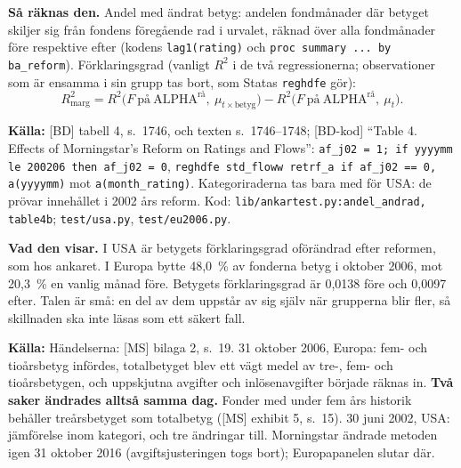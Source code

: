 \documentclass[10pt,a4paper]{article}
\newcommand{\kalla}[1]{\par\noindent\textbf{Källa:} #1\par}
\newcommand{\raknas}{\par\noindent\textbf{Så räknas den.} }
\newcommand{\visar}{\par\noindent\textbf{Vad den visar.} }
\newcommand{\kod}[1]{\texttt{#1}}
\begin{document}
\begin{table}[H]
\caption{Two rating reforms in the form of Table 4 of Ben-David et al.\ (2022). The first row of each panel gives the share of fund-months in which the fund's rating differs from its previous observation in the sample. ``Explained by month $\times$ rating'' is the $R^2$ of a regression of flow on the 18-month raw return with month-by-rating effects, minus the $R^2$ with month effects only; ``category beyond rating'' adds month-by-category effects to month-by-rating effects. The event month counts as before. Panel A: Morningstar began rating U.S. funds within category peer groups on 30 June 2002. Panel B: on 31 October 2006 Morningstar introduced five- and ten-year ratings in Europe and made the overall rating a weighted average of the three-, five- and ten-year ratings (Morningstar 2023, Appendix 2).}
\centering\resizebox{\textwidth}{!}{}
\end{table}
\raknas Andel med ändrat betyg: andelen fondmånader där betyget skiljer sig från fondens föregående rad i urvalet, räknad över alla fondmånader före respektive efter (kodens \kod{lag1(rating)} och \kod{proc summary ... by ba\_reform}). Förklaringsgrad (vanligt $R^2$ i de två regressionerna; observationer som är ensamma i sin grupp tas bort, som Statas \kod{reghdfe} gör):
\begin{equation}
R^2_{\text{marg}}=R^2\big(F\ \text{på}\ \text{ALPHA}^{\text{rå}},\ \mu_{t\times\text{betyg}}\big)-R^2\big(F\ \text{på}\ \text{ALPHA}^{\text{rå}},\ \mu_t\big).
\end{equation}
\kalla{[BD] tabell 4, s.~1746, och texten s.~1746--1748; [BD-kod] ``Table 4. Effects of Morningstar's Reform on Ratings and Flows'': \kod{af\_j02 = 1; if yyyymm le 200206 then af\_j02 = 0}, \kod{reghdfe std\_floww retrf\_a if af\_j02 == 0, a(yyyymm)} mot \kod{a(month\_rating)}. Kategoriraderna tas bara med för USA: de prövar innehållet i 2002 års reform. Kod: \kod{lib/ankartest.py:andel\_andrad, table4b}; \kod{test/usa.py}, \kod{test/eu2006.py}.}
\visar I USA är betygets förklaringsgrad oförändrad efter reformen, som hos ankaret. I Europa bytte 48,0~\% av fonderna betyg i oktober 2006, mot 20,3~\% en vanlig månad före. Betygets förklaringsgrad är 0,0138 före och 0,0097 efter. Talen är små: en del av dem uppstår av sig själv när grupperna blir fler, så skillnaden ska inte läsas som ett säkert fall.
\kalla{Händelserna: [MS] bilaga 2, s.~19. 31 oktober 2006, Europa: fem- och tioårsbetyg infördes, totalbetyget blev ett vägt medel av tre-, fem- och tioårsbetygen, och uppskjutna avgifter och inlösenavgifter började räknas in. \textbf{Två saker ändrades alltså samma dag.} Fonder med under fem års historik behåller treårsbetyget som totalbetyg ([MS] exhibit 5, s.~15). 30 juni 2002, USA: jämförelse inom kategori, och tre ändringar till. Morningstar ändrade metoden igen 31 oktober 2016 (avgiftsjusteringen togs bort); Europapanelen slutar där.}
\end{document}
